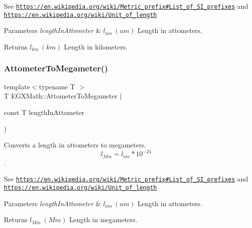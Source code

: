 See \href{https://en.wikipedia.org/wiki/Metric_prefix#List_of_SI_prefixes}{\tt https\+://en.\+wikipedia.\+org/wiki/\+Metric\+\_\+prefix\#\+List\+\_\+of\+\_\+\+S\+I\+\_\+prefixes} and \href{https://en.wikipedia.org/wiki/Unit_of_length}{\tt https\+://en.\+wikipedia.\+org/wiki/\+Unit\+\_\+of\+\_\+length} 
\begin{DoxyParams}{Parameters}
{\em length\+In\+Attometer} & $ l_{am}\ (am)$ Length in attometers. \\
\hline
\end{DoxyParams}
\begin{DoxyReturn}{Returns}
$ l_{km}\ (km)$ Length in kilometers. 
\end{DoxyReturn}
\mbox{\label{group___e_g_x_math-_conversions-_length_conversions-_s_i-_attometer-_s_i_gad381bcfa61a8521acea1c79f84750a5d}} 
\subsubsection{\texorpdfstring{Attometer\+To\+Megameter()}{AttometerToMegameter()}}
{\footnotesize\ttfamily template$<$typename T $>$ \\
T E\+G\+X\+Math\+::\+Attometer\+To\+Megameter (\begin{DoxyParamCaption}\item[{const T}]{length\+In\+Attometer }\end{DoxyParamCaption})}



Converts a length in attometers to megameters. \[ l_{Mm}=l_{am} * 10^{-24} \]. 

See \href{https://en.wikipedia.org/wiki/Metric_prefix#List_of_SI_prefixes}{\tt https\+://en.\+wikipedia.\+org/wiki/\+Metric\+\_\+prefix\#\+List\+\_\+of\+\_\+\+S\+I\+\_\+prefixes} and \href{https://en.wikipedia.org/wiki/Unit_of_length}{\tt https\+://en.\+wikipedia.\+org/wiki/\+Unit\+\_\+of\+\_\+length} 
\begin{DoxyParams}{Parameters}
{\em length\+In\+Attometer} & $ l_{am}\ (am)$ Length in attometers. \\
\hline
\end{DoxyParams}
\begin{DoxyReturn}{Returns}
$ l_{Mm}\ (Mm)$ Length in megameters. 
\end{DoxyReturn}
\mbox{\label{group___e_g_x_math-_conversions-_length_conversions-_s_i-_attometer-_s_i_gaa987cce911ce54c3022444537c705b97}} 
